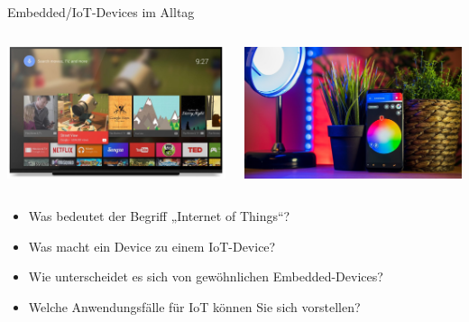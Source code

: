 \begin{frame}{Embedded/IoT-Devices im Alltag}
    \begin{columns}
        \begin{column}[b]{.5\textwidth}
            \begin{center}
                \includegraphics[width=\textwidth]{1-grundlagen/img/android_tv}
            \end{center}
        \end{column}
        \begin{column}[b]{.5\textwidth}
            \begin{center}
                \includegraphics[width=\textwidth]{1-grundlagen/img/smart-home-3779361_1280}
            \end{center}
        \end{column}
    \end{columns}

    \bigskip

    \begin{itemize}
        \item Was bedeutet der Begriff „Internet of Things“?
        \item Was macht ein Device zu einem IoT-Device?
        \item Wie unterscheidet es sich von gewöhnlichen Embedded-Devices?
        \item Welche Anwendungsfälle für IoT können Sie sich vorstellen?
    \end{itemize}
\end{frame}

